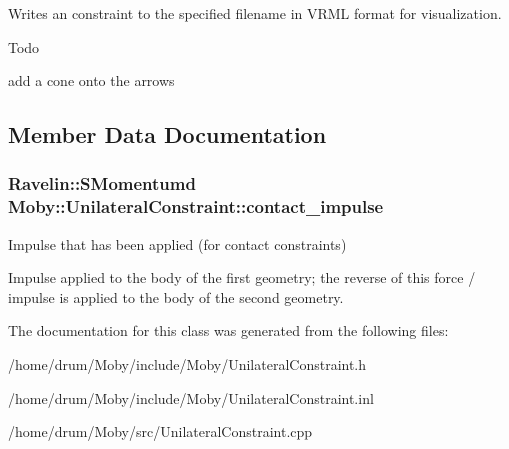Writes an constraint to the specified filename in V\-R\-M\-L format for visualization. 

\begin{DoxyRefDesc}{Todo}
\item[{\bf Todo}]add a cone onto the arrows \end{DoxyRefDesc}


\subsection{Member Data Documentation}
\subsubsection[{contact\-\_\-impulse}]{\setlength{\rightskip}{0pt plus 5cm}Ravelin\-::\-S\-Momentumd Moby\-::\-Unilateral\-Constraint\-::contact\-\_\-impulse}\label{classMoby_1_1UnilateralConstraint_a8a8965a33e493c6c8d79e96cb8c87c41}


Impulse that has been applied (for contact constraints) 

Impulse applied to the body of the first geometry; the reverse of this force / impulse is applied to the body of the second geometry. 

The documentation for this class was generated from the following files\-:\begin{DoxyCompactItemize}
\item 
/home/drum/\-Moby/include/\-Moby/Unilateral\-Constraint.\-h\item 
/home/drum/\-Moby/include/\-Moby/Unilateral\-Constraint.\-inl\item 
/home/drum/\-Moby/src/Unilateral\-Constraint.\-cpp\end{DoxyCompactItemize}

